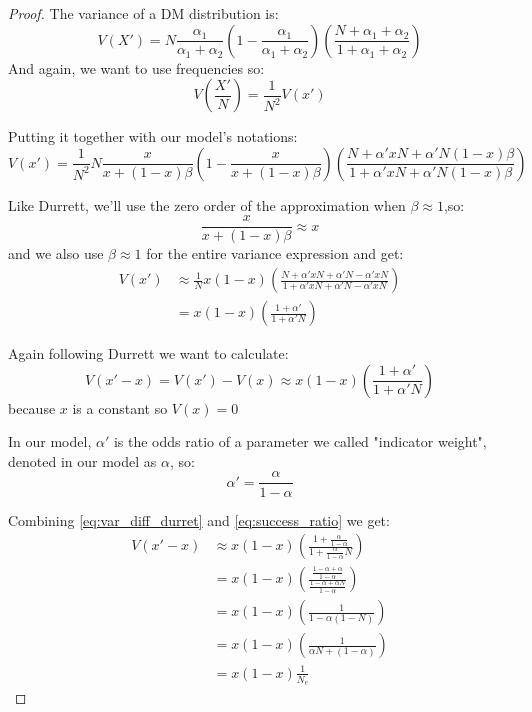 \documentclass[12pt]{extarticle}
\begin{document}
\begin{proof}
The variance of a DM distribution is:
\begin{equation}
V(X') = N\frac{\alpha_1}{\alpha_1+\alpha_2}(1-\frac{\alpha_1}{\alpha_1+\alpha_2})
(\frac{N + \alpha_1+\alpha_2}{1+\alpha_1+\alpha_2})
\end{equation}
And again, we want to use frequencies so:
\begin{equation}
V(\frac{X'}{N}) = \frac{1}{N^2}V(x')
\end{equation}

Putting it together with our model's notations:
\begin{equation}
V(x') = \frac{1}{N^2}N\frac{x}{x+(1-x)\beta}(1-\frac{x}{x+(1-x)\beta})
(\frac{N + \alpha' xN + \alpha' N(1-x)\beta}{1 + \alpha' xN + \alpha' N(1-x)\beta}) 
\end{equation}

Like Durrett, we'll use the zero order of the approximation when $\beta\approx1$,so:
\begin{equation}
\frac{x}{x + (1-x)\beta} \approx x
\end{equation}
and we also use $\beta\approx1$ for the entire variance expression and get:
\begin{equation}
\begin{split}
V(x') & \approx  \frac{1}{N} x(1-x)
(\frac{N + \alpha' xN + \alpha' N - \alpha' xN}{1 + \alpha' xN + \alpha' N - \alpha' xN})\\
&=  x(1-x)(\frac{1 + \alpha'}{1 + \alpha' N}) 
\end{split}
\end{equation}

Again following Durrett we want to calculate:
\begin{equation}\label{eq:var_diff_durret}
V(x'-x) = V(x') - V(x) \approx  x(1-x)(\frac{1 + \alpha'}{1 + \alpha' N})
\end{equation}
because $x$ is a constant so $V(x) = 0$

In our model, $\alpha'$ is the odds ratio of a parameter we called "indicator weight", denoted in our model as $\alpha$, so:
\begin{equation}\label{eq:success_ratio}
\alpha' = \frac{\alpha}{1-\alpha}
\end{equation}

Combining \cref{eq:var_diff_durret} and \cref{eq:success_ratio} we get:
\begin{equation}\label{eq:const_var}
\begin{split}
V(x'-x) & \approx x(1-x)(\frac{1 + \frac{\alpha}{1-\alpha}}{1 + \frac{\alpha}{1-\alpha} N})\\
 &= x(1-x)(\frac{\frac{1-\alpha+\alpha}{1-\alpha}}{\frac{1-\alpha+\alpha N}{1-\alpha}})\\
 &= x(1-x)(\frac{1}{1- \alpha(1-N)})\\
  &= x(1-x)(\frac{1}{\alpha N + (1-\alpha)})\\
  &= x(1-x)\frac{1}{N_e}
\end{split}
\end{equation}


\end{proof}
\end{document}
